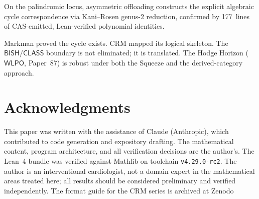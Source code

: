 \documentclass[11pt]{article}
\theoremstyle{plain}
\theoremstyle{definition}
\theoremstyle{remark}
\newcommand{\BISH}{\mathsf{BISH}}
\newcommand{\WLPO}{\mathsf{WLPO}}
\newcommand{\CLASS}{\mathsf{CLASS}}
\begin{document}
On the palindromic locus, asymmetric offloading constructs the
explicit algebraic cycle correspondence via Kani--Rosen genus-2
reduction, confirmed by 177~lines of CAS-emitted, Lean-verified
polynomial identities.

Markman proved the cycle exists.  CRM mapped its logical skeleton.
The $\BISH/\CLASS$ boundary is not eliminated; it is translated.
The Hodge Horizon ($\WLPO$, Paper~87) is robust under both the
Squeeze and the derived-category approach.

\section*{Acknowledgments}

This paper was written with the assistance of Claude (Anthropic),
which contributed to code generation and expository drafting.
The mathematical content, program architecture, and all
verification decisions are the author's.  The Lean~4 bundle was
verified against Mathlib on toolchain \texttt{v4.29.0-rc2}.
The author is an interventional cardiologist, not a domain expert in the mathematical areas treated here; all results should be considered preliminary and verified independently.
The format guide for the CRM series is archived at Zenodo
\end{document}

